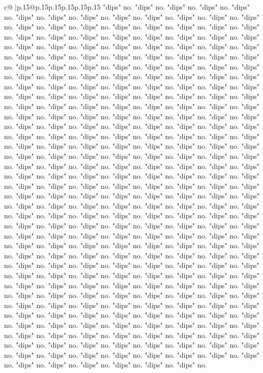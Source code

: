 \documentclass{article}
\begin{document}
{\begin{supertabular}{c@{$\;$}|p{.15\linewidth}@{}p{.15\linewidth}p{.15\linewidth}p{.15\linewidth}p{.15\linewidth}p{.15\linewidth}}
{{{"dips" no. "dips" no. "dips" no. "dips" no. "dips" no. "dips" no. "dips" no. "dips" no. "dips" no. "dips" no. "dips" no. "dips" no. "dips" no. "dips" no. "dips" no. "dips" no. "dips" no. "dips" no. "dips" no. "dips" no. "dips" no. "dips" no. "dips" no. "dips" no. "dips" no. "dips" no. "dips" no. "dips" no. "dips" no. "dips" no. "dips" no. "dips" no. "dips" no. "dips" no. "dips" no. "dips" no. "dips" no. "dips" no. "dips" no. "dips" no. "dips" no. "dips" no. "dips" no. "dips" no. "dips" no. "dips" no. "dips" no. "dips" no. "dips" no. "dips" no. "dips" no. "dips" no. "dips" no. "dips" no. "dips" no. "dips" no. "dips" no. "dips" no. "dips" no. "dips" no. "dips" no. "dips" no. "dips" no. "dips" no. "dips" no. "dips" no. "dips" no. "dips" no. "dips" no. "dips" no. "dips" no. "dips" no. "dips" no. "dips" no. "dips" no. "dips" no. "dips" no. "dips" no. "dips" no. "dips" no. "dips" no. "dips" no. "dips" no. "dips" no. "dips" no. "dips" no. "dips" no. "dips" no. "dips" no. "dips" no. "dips" no. "dips" no. "dips" no. "dips" no. "dips" no. "dips" no. "dips" no. "dips" no. "dips" no. "dips" no. "dips" no. "dips" no. "dips" no. "dips" no. "dips" no. "dips" no. "dips" no. "dips" no. "dips" no. "dips" no. "dips" no. "dips" no. "dips" no. "dips" no. "dips" no. "dips" no. "dips" no. "dips" no. "dips" no. "dips" no. "dips" no. "dips" no. "dips" no. "dips" no. "dips" no. "dips" no. "dips" no. "dips" no. "dips" no. "dips" no. "dips" no. "dips" no. "dips" no. "dips" no. "dips" no. "dips" no. "dips" no. "dips" no. "dips" no. "dips" no. "dips" no. "dips" no. "dips" no. "dips" no. "dips" no. "dips" no. "dips" no. "dips" no. "dips" no. "dips" no. "dips" no. "dips" no. "dips" no. "dips" no. "dips" no. "dips" no. "dips" no. "dips" no. "dips" no. "dips" no. "dips" no. "dips" no. "dips" no. "dips" no. "dips" no. "dips" no. "dips" no. "dips" no. "dips" no. "dips" no. "dips" no. "dips" no. "dips" no. "dips" no. "dips" no. "dips" no. "dips" no. "dips" no. "dips" no. "dips" no. "dips" no. "dips" no. "dips" no. "dips" no. "dips" no. "dips" no. "dips" no. "dips" no. "dips" no. "dips" no. "dips" no. "dips" no. "dips" no. "dips" no. "dips" no. "dips" no. "dips" no. "dips" no. "dips" no. "dips" no. "dips" no. "dips" no. "dips" no. "dips" no. "dips" no. "dips" no. "dips" no. "dips" no. "dips" no. "dips" no. "dips" no. "dips" no. "dips" no. "dips" no. "dips" no. "dips" no. "dips" no. "dips" no. "dips" no. "dips" no. "dips" no. "dips" no. "dips" no. "dips" no. "dips" no. "dips" no. "dips" no. "dips" no. "dips" no. "dips" no. "dips" no. "dips" no. "dips" no. "dips" no. "dips" no. "dips" no. "dips" no. "dips" no. "dips" no. "dips" no. "dips" no. "dips" no. "dips" no. "dips" no. "dips" no. "dips" no. "dips" no. "dips" no. "dips" no. "dips" no. "dips" no. "dips" no. "dips" no. "dips" no. "dips" no. "dips" no. "dips" no. "dips" no. "dips" no. "dips" no. "dips" no. "dips" no. "dips" no. "dips" no. "dips" no. "dips" no. "dips" no. "dips" no. "dips" no. "dips" no. "dips" no. "dips" no. "dips" no. "dips" no. "dips" no. "dips" no. "dips" no. "dips" no. "dips" no. "dips" no. "dips" no. "dips" no. "dips" no. "dips" no. "dips" no. "dips" no. "dips" no. "dips" no. "dips" no. "dips" no. "dips" no. }}}
\end{supertabular}}
\end{document}
